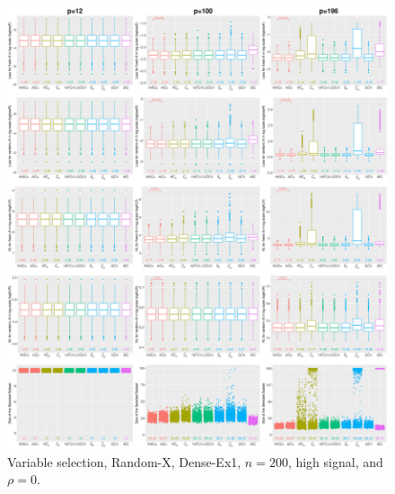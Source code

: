 \begin{figure}[!ht]
\centering
\includegraphics[width=\textwidth]{figures/supplement/randomx/subset_selection/Dense-Ex1_n200_hsnr_rho0.eps}
\caption{Variable selection, Random-X, Dense-Ex1, $n=200$, high signal, and $\rho=0$.}
\end{figure}
\clearpage
